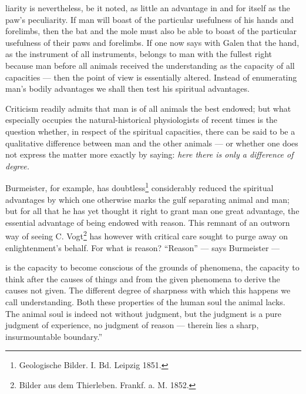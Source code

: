 \documentclass[12pt,a4paper]{book}
\begin{document}
\setcounter{footnote}{0}%
liarity is nevertheless, be it noted, as little an advantage in and for itself as the
paw's peculiarity. If man will boast of the particular usefulness of his hands and
forelimbs, then the bat and the mole must also be able to boast of the particular
usefulness of their paws and forelimbs. If one now says with Galen that the hand, as
the instrument of all instruments, belongs to man with the fullest right because man
before all animals received the understanding as the capacity of all capacities --- then
the point of view is essentially altered. Instead of enumerating man's bodily advantages
we shall then test his spiritual advantages.

Criticism readily admits that man is of all animals the best endowed; but what
especially occupies the natural-historical physiologists of recent times is the
question whether, in respect of the spiritual capacities, there can be said to be a
qualitative difference between man and the other animals --- or whether one does not
express the matter more exactly by saying: \emph{here there is only a difference of
degree.}

Burmeister, for example, has doubtless\footnote{Geologische Bilder. I. Bd. Leipzig
1851.} considerably reduced the spiritual advantages by which one otherwise marks the
gulf separating animal and man; but for all that he has yet thought it right to grant
man one great advantage, the essential advantage of being endowed with reason. This
remnant of an outworn way of seeing C. Vogt\footnote{Bilder aus dem Thierleben.
Frankf. a. M. 1852.} has however with critical care sought to purge away on
enlightenment's behalf. For what is reason? ``Reason'' --- says Burmeister ---

is the capacity to become conscious of the grounds of phenomena, the capacity to think
after the causes of things and from the given phenomena to derive the causes not given.
The different degree of sharpness with which this happens we call understanding. Both
these properties of the human soul the animal lacks. The animal soul is indeed not
without judgment, but the judgment is a pure judgment of experience, no judgment of
reason --- therein lies a sharp, insurmountable boundary.''
\end{document}
